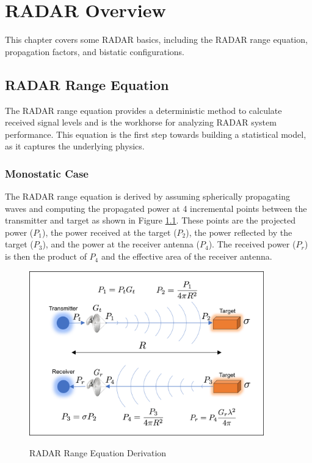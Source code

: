 \chapter{RADAR Overview}\label{chapter_radar_basics}
This chapter covers some RADAR basics, including the RADAR range equation, propagation factors, and bistatic configurations.

\section{RADAR Range Equation} 
The RADAR range equation provides a deterministic method to calculate received signal levels and is the workhorse for analyzing RADAR system performance. This equation is the first step towards building a statistical model, as it captures the underlying physics.

\subsection{Monostatic Case}
The RADAR range equation is derived by assuming spherically propagating waves and computing the propagated power at 4 incremental points between the transmitter and target as shown in Figure \ref{intro_fig:1}. These points are the projected power ($P_1$), the power received at the target ($P_2$), the power reflected by the target ($P_3$), and the power at the receiver antenna ($P_4$). The received power ($P_r$) is then the product of $P_4$ and the effective area of the receiver antenna.

\begin{figure}[H]
  \begin{center}
\includegraphics[width=4in]{../media/multistatic/radar_range_equation.png}
  \end{center}
  \renewcommand{\baselinestretch}{1} \small\normalsize
  \begin{quote}
    \caption[RADAR Range Equation Derivation]{RADAR Range Equation Derivation \label{intro_fig:1}}
  \end{quote}
\end{figure}
\renewcommand{\baselinestretch}{2} \small\normalsize

